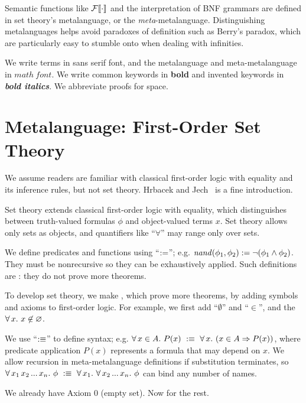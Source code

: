 Semantic functions like $\mathcal{F}\!\left\llbracket{\cdot}\right\rrbracket$ and the interpretation of BNF grammars are defined in set theory's metalanguage, or the \emph{meta}-metalanguage.
Distinguishing metalanguages helps avoid paradoxes of definition such as Berry's paradox, which are particularly easy to stumble onto when dealing with infinities.

We write \ftargetlang terms in \textsf{sans serif} font, and the metalanguage and meta-metalanguage in $\mathit{math\ font}$. We write common keywords in \textbf{bold} and invented keywords in \textbf{\textit{bold italics}}. We abbreviate proofs for space.


\section{Metalanguage: First-Order Set Theory}
\label{sec:metalanguage}

We assume readers are familiar with classical first-order logic with equality and its inference rules, but not set theory. Hrbacek and Jech~\cite{cit:hrbacek-1999-set-theory} is a fine introduction.

Set theory extends classical first-order logic with equality, which distinguishes between truth-valued formulas $\phi$ and object-valued terms $x$. Set theory allows only sets as objects, and quantifiers like ``$\forall$'' may range only over sets.

We define predicates and functions using ``$:=$''; e.g. $\mathit{nand}(\phi_1,\phi_2) := \neg (\phi_1 \wedge \phi_2)$. They must be nonrecursive so they can be exhaustively applied. Such definitions are : they do not prove more theorems.

To develop set theory, we make , which prove more theorems, by adding symbols and axioms to first-order logic. For example, we first add ``$\emptyset$'' and ``$\in$'', and the  $\forall\,{x}\ldotp\,{x \not\in \varnothing}$.

We use ``$:\equiv$'' to define syntax; e.g. $\Forall{x \in A}{P(x)}\ \metastx\ \Forall{x}{(x \in A \imp P(x))}$, where predicate application $P(x)$ represents a formula that may depend on $x$. We allow recursion in meta-metalanguage definitions if substitution terminates, so $\forall\,{x_1\,x_2\,...\,x_n}\ldotp\, \phi\ :\equiv\ \forall\,{x_1}\ldotp\, \forall\,{x_2\,...\,x_n}\ldotp\, \phi$ can bind any number of names.

We already have Axiom 0 (empty set). Now for the rest.

